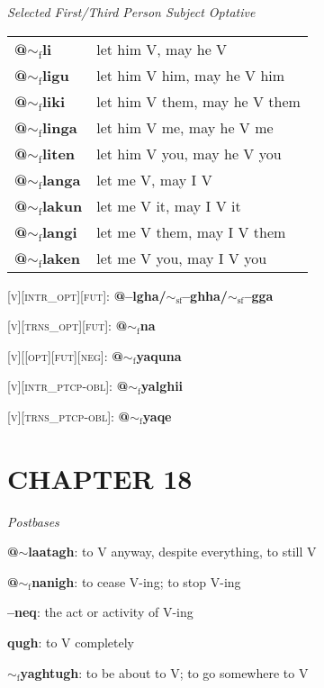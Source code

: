 \documentclass{article}
\begin{document}
\bigskip

\textit{Selected First/Third Person Subject Optative}

\begin{tabular}{ l l }
\textbf{@$\sim_\text{f}$li} & let him V, may he V \\
\textbf{@$\sim_\text{f}$ligu} & let him V him, may he V him \\
\textbf{@$\sim_\text{f}$liki} & let him V them, may he V them \\
\textbf{@$\sim_\text{f}$linga} & let him V me, may he V me \\
\textbf{@$\sim_\text{f}$liten} & let him V you, may he V you \\
\textbf{@$\sim_\text{f}$langa} & let me V, may I V \\
\textbf{@$\sim_\text{f}$lakun} & let me V it, may I V it \\
\textbf{@$\sim_\text{f}$langi} & let me V them, may I V them \\
\textbf{@$\sim_\text{f}$laken} & let me V you, may I V you
\end{tabular}

\bigskip

\textsc{[v][intr\_opt][fut]}: \textbf{@--lgha/$\sim_\text{sf}$--ghha/$\sim_\text{sf}$--gga}

\textsc{[v][trns\_opt][fut]}: \textbf{@$\sim_\text{f}$na}

\bigskip

\textsc{[v][[opt][fut][neg]}: \textbf{@$\sim_\text{f}$yaquna}

\bigskip

\textsc{[v][intr\_ptcp-obl]}: \textbf{@$\sim_\text{f}$yalghii}

\textsc{[v][trns\_ptcp-obl]}: \textbf{@$\sim_\text{f}$yaqe}


\section*{CHAPTER 18}

\textit{Postbases}
\begin{description}
\item \textbf{@$\sim$laatagh}: to V anyway, despite everything, to still V
\item \textbf{@$\sim_\text{f}$nanigh}: to cease V-ing; to stop V-ing
\item \textbf{--neq}: the act or activity of V-ing
\item \textbf{qugh}: to V completely
\item \textbf{$\sim_\text{f}$yaghtugh}: to be about to V; to go somewhere to V
\end{description}
\end{document}

